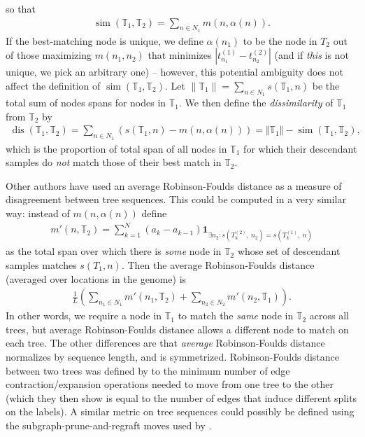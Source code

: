 \documentclass[10pt,twoside,lineno]{gsajnl}
\newcommand{\T}{\mathbb{T}}
\newcommand{\ind}{\mathbf{1}}
\newcommand{\dis}{\operatorname{dis}}
\newcommand{\similarity}{\operatorname{sim}}
\begin{document}
so that
\begin{align*}
    \similarity(\T_1, \T_2)
    =
    \sum_{n \in N_1} m(n, \alpha(n)) .
\end{align*}
If the best-matching node is unique, we define $\alpha(n_1)$ to be the node in $T_2$
out of those maximizing $m(n_1, n_2)$ that minimizes $|t^{(1)}_{n_1} - t^{(2)}_{n_2}|$
(and if \emph{this} is not unique, we pick an arbitrary one) --
however, this potential ambiguity does not affect the definition of $\similarity(\T_1, \T_2)$.
Let $\|\T_1\|=\sum_{n\in N_1}s(\T_1,n)$ be the total sum of nodes spans for nodes in $\T_1$.
We then define the \emph{dissimilarity} of $\T_1$ from $\T_2$ by
\begin{align*}
    \dis(\T_1, \T_2)
    =
    \sum_{n \in N_1} (s(\T_1, n) - m(n, \alpha(n))) 
    = 
    \Vert \T_1\Vert -\similarity(\T_1,\T_2),
\end{align*}
which is the proportion of total span of all nodes in $\T_1$
for which their descendant samples do \emph{not} match those of their best match in $\T_2$.

Other authors \citep[e.g.,]{kelleher2019inferring} have used
an average Robinson-Foulds distance \citep{robinson1981comparison}
as a measure of disagreement between tree sequences.
This could be computed in a very similar way:
instead of $m(n, \alpha(n))$ define
\begin{align*}
    m'(n, \T_2) = \sum_{k=1}^N (a_k - a_{k-1}) \ind_{\exists n_2: s(T^{(2)}_k,\ n_2) = s(T^{(1)}_k,\ n)} 
\end{align*}
as the total span over which there is \emph{some} node in $\T_2$ whose set of descendant samples
matches $s(T_1,n)$.
Then the average Robinson-Foulds distance (averaged over locations in the genome)
is
\begin{align*}
    \frac{1}{L} \left( \sum_{n_1 \in N_1} m'(n_1, \T_2)  + \sum_{n_2 \in N_2} m'(n_2, \T_1) \right).
\end{align*}
In other words, we require a node in $\T_1$ to match the \emph{same} node in $\T_2$
across all trees, but average Robinson-Foulds distance allows a different node to match
on each tree.
The other differences are that \emph{average} Robinson-Foulds distance
normalizes by sequence length, and is symmetrized.
Robinson-Foulds distance between two trees
was defined by \citet{robinson1981comparison}
to the minimum number of edge contraction/expansion operations needed to move
from one tree to the other
(which they then show is equal to the number of edges that induce different splits on the labels).
A similar metric on tree sequences could possibly be defined
using the subgraph-prune-and-regraft moves used by \citet{deng2024robust}.
\end{document}
